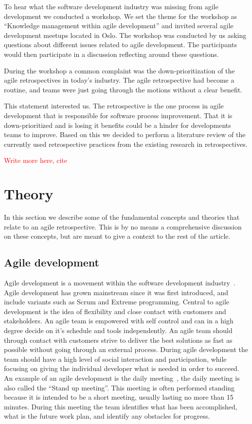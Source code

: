 \documentclass[12pt]{article}
\newcommand\todo[1]{\textcolor{red}{#1}}
\begin{document}
To hear what the software development industry was missing from agile development we conducted a workshop. We set the theme for the workshop as ``Knowledge management within agile development'' and invited several agile development meetups located in Oslo. The workshop was conducted by us asking questions about different issues related to agile development. The participants would then participate in a discussion reflecting around these questions. 

During the workshop a common complaint was the down-prioritization of the agile retrospectives in today's industry. The agile retrospective had become a routine, and teams were just going through the motions without a clear benefit.

This statement interested us. The retrospective is the one process in agile development that is responsible for software process improvement. That it is down-prioritized and is losing it benefits could be a hinder for developments teams to improve. Based on this we decided to perform a literature review of the currently used retrospective practices from the existing research in retrospectives.

\todo{Write more here, cite}

\section{Theory}
In this section we describe some of the fundamental concepts and theories that relate to an agile retrospective. This is by no means a comprehensive discussion on these concepts, but are meant to give a context to the rest of the article. 

\subsection{Agile development}
Agile development is a movement within the software development industry~\cite{Tessem2014}. Agile development has grown mainstream since it was first introduced, and include variants such as Scrum and Extreme programming. Central to agile development is the idea of flexibility and close contact with customers and stakeholders. An agile team is empowered with self control and can in a high degree decide on it's schedule and tools independently. An agile team should through contact with customers strive to deliver the best solutions as fast as possible without going through an external process. During agile development the team should have a high level of social interaction and participation, while focusing on giving the individual developer what is needed in order to succeed. An example of an agile development is the daily meeting~\cite{Stray2012}, the daily meeting is also called the ``Stand up meeting''. This meeting is often performed standing because it is intended to be a short meeting, usually lasting no more than 15 minutes. During this meeting the team identifies what has been accomplished, what is the future work plan, and identify any obstacles for progress.
\end{document}
